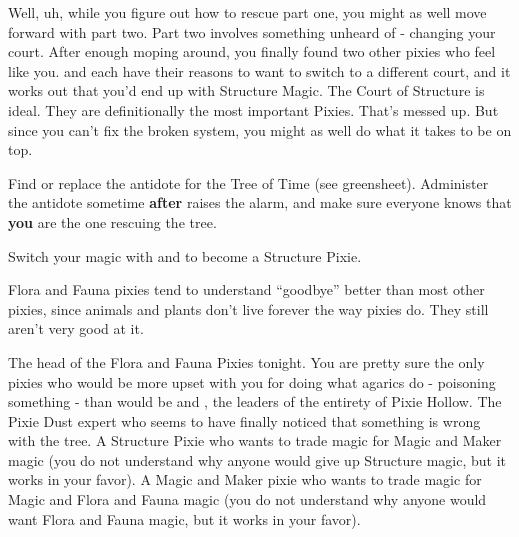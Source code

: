 \documentclass[char]{PP}
\begin{document}
Well, uh, while you figure out how to rescue part one, you might as well move forward with part two. Part two involves something unheard of - changing your court. After enough moping around, you finally found two other pixies who feel like you. \cSAdvisor{} and \cSChange{} each have their reasons to want to switch to a different court, and it works out that you’d end up with Structure Magic. The Court of Structure is ideal. They are definitionally the most important Pixies. That’s messed up. But since you can’t fix the broken system, you might as well do what it takes to be on top.

\begin{itemz}
	\item Find or replace the antidote for the Tree of Time (see greensheet). Administer the antidote sometime \textbf{after} \cMTree{} raises the alarm, and make sure everyone knows that \textbf{you} are the one rescuing the tree.
	\item Switch your magic with \cSAdvisor{} and \cMChange{} to become a Structure Pixie.
\end{itemz}

\begin{itemz}[Notes]
	\item Flora and Fauna pixies tend to understand ``goodbye'' better than most other pixies, since animals and plants don’t live forever the way pixies do. They still aren't very good at it.
\end{itemz}

\begin{contacts}
	\contact{\cFHead{}} The head of the Flora and Fauna Pixies tonight. You are pretty sure the only pixies who would be more upset with you for doing what agarics do - poisoning something - than \cFHead{} would be \cSHead{} and \cSAdvisor{}, the leaders of the entirety of Pixie Hollow.
	\contact{\cMTree{}} The Pixie Dust expert who seems to have finally noticed that something is wrong with the tree.
	\contact{\cSAdvisor{}} A Structure Pixie who wants to trade \cSAdvisor{\their} magic for Magic and Maker magic (you do not understand why anyone would give up Structure magic, but it works in your favor).
	\contact{\cSChange{}} A Magic and Maker pixie who wants to trade \cSAdvisor{\their} magic for Magic and Flora and Fauna magic (you do not understand why anyone would want Flora and Fauna magic, but it works in your favor).
\end{contacts}
\end{document}
